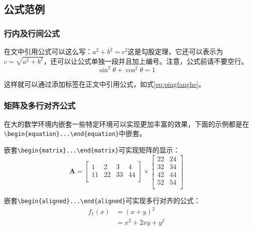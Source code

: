 \subsection{公式范例}

\subsubsection{行内及行间公式}

在文中引用公式可以这么写：$a^2+b^2=c^2$这是勾股定理，它还可以表示为$c=\sqrt{a^2+b^2}$，还可以让公式单独一段并且加上编号。注意，公式前请不要空行。
\begin{equation}
\sin^2{\theta}+\cos^2{\theta}=1 \label{eq:pingfanghe}
\end{equation}

这样就可以通过添加标签在正文中引用公式，如式\eqref{eq:pingfanghe}。

\subsubsection{矩阵及多行对齐公式}

在大的数学环境内嵌套一些特定环境可以实现更加丰富的效果，下面的示例都是在\verb|\begin{equation}...\end{equation}|中嵌套。

嵌套\verb|\begin{matrix}...\end{matrix}|可实现矩阵的显示：
\begin{equation}
  \mathbf{A}=
  \left[\begin{matrix}
    1&2&3&4\\
    11&22&33&44\\
  \end{matrix}\right] \times
  \left[\begin{matrix}
    22&24\\
    32&34\\
    42&44\\
    52&54\\
  \end{matrix}\right]
\end{equation}

嵌套\verb|\begin{aligned}...\end{aligned}|可实现多行对齐的公式：
\begin{equation}
  \begin{aligned}
    f_1(x)&=(x+y)^2\\
          &=x^2+2xy+y^2
  \end{aligned}
\end{equation}

